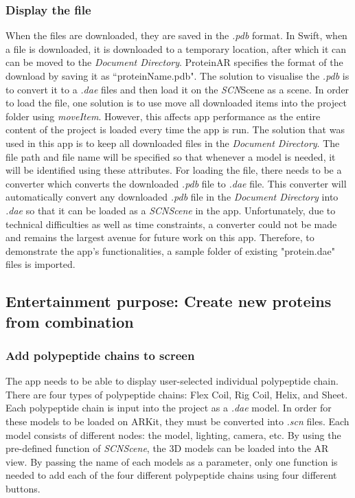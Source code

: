	\subsubsection{Display the file}
When the 	files are downloaded, they are saved in the \emph{.pdb} format. In Swift, when a file is downloaded, it is downloaded to a temporary location, after which it can can be moved to the \emph{Document Directory}. ProteinAR specifies the format of the download by saving it as ``proteinName.pdb". 
The solution to visualise the \emph{.pdb} is to convert it to a \emph{.dae} files and then load it on the \emph{SCN}Scene as a scene. 
In order to load the file, one solution is to use move all downloaded items into the project folder using \emph{moveItem}. However, this affects app performance as the entire content of the project is loaded every time the app is run. The solution that was used in this app is to keep all downloaded files in the \emph{Document Directory}. The file path and file name will be specified so that whenever a model is needed, it will be identified using these attributes. 
For loading the file, there needs to be a converter which converts the downloaded \emph{.pdb} file to \emph{.dae} file. This converter will automatically convert any downloaded \emph{.pdb} file in the \emph{Document Directory} into \emph{.dae} so that it can be loaded as a \emph{SCNScene} in the app. 
Unfortunately, due to technical difficulties as well as time constraints, a converter could not be made and remains the largest avenue for future work on this app. Therefore, to demonstrate the app's functionalities, a sample folder of existing "protein.dae" files is imported. 

 	
\subsection{Entertainment purpose: Create new proteins from combination}
\subsubsection{Add polypeptide chains to screen}
The app needs to be able to display user-selected individual polypeptide chain. There are four types of polypeptide chains: Flex Coil, Rig Coil, Helix, and Sheet. Each polypeptide chain is input into the project as a \emph{.dae} model. In order for these models to be loaded on ARKit, they must be converted into \emph{.scn} files. Each model consists of different nodes: the model, lighting, camera, etc. By using the pre-defined function of \emph{SCNScene}, the 3D models can be loaded into the AR view. By passing  the name of each models as a parameter, only one function is needed to add each of the four different polypeptide chains using four different buttons. 

